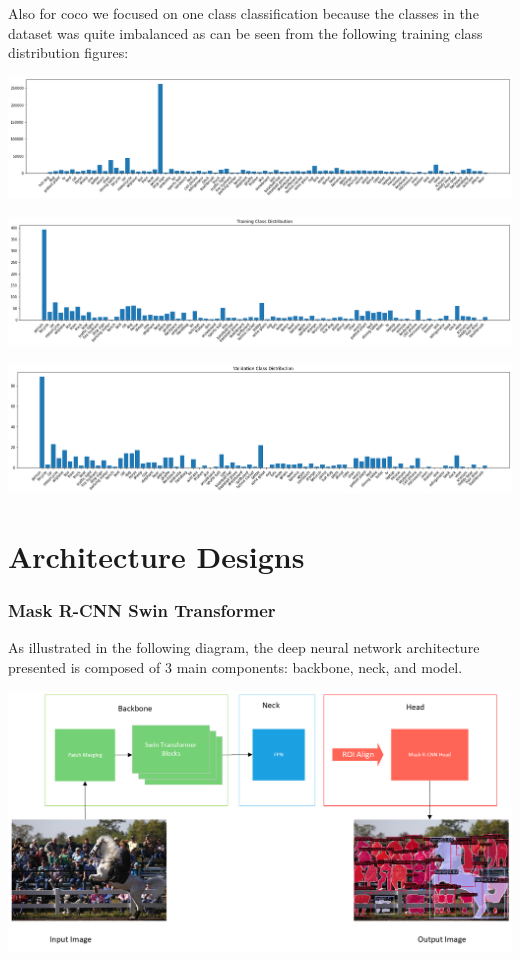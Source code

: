 \documentclass[10pt,twocolumn,letterpaper]{article}
\begin{document}
Also for coco we focused on one class classification because the classes in the dataset was quite imbalanced as can be seen from the following training class distribution figures:

\includegraphics[width=0.8\linewidth]{docs/latex/images/brandon/coco17_train.png}

\includegraphics[width=0.8\linewidth]{docs/latex/images/brandon/coco17_train_trunc.png}

\includegraphics[width=0.8\linewidth]{docs/latex/images/brandon/coco17_val_trunc.png}

\section{Architecture Designs}




\subsubsection{Mask R-CNN Swin Transformer}


As illustrated in the following diagram, the deep neural network architecture presented is composed of 3 main components: backbone, neck, and model.

\includegraphics[width=1.0\linewidth]{docs/latex/images/brandon/Architecture.png}
\end{document}
